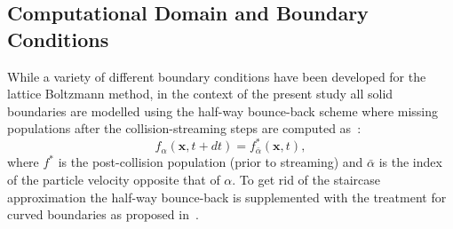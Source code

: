 \subsection{Computational Domain and Boundary Conditions}
\label{sec:numerics:domain}

While a variety of different boundary conditions have been developed for the lattice Boltzmann method, in the context of the present study all solid boundaries are modelled using the half-way bounce-back scheme where missing populations after the collision-streaming steps are computed as~\cite{kruger2017lattice}:
\begin{equation}
    f_\alpha\left(\bm{x},t+dt\right) = f^{*}_{\bar{\alpha}}\left(\bm{x},t\right),
\end{equation}
where $f^{*}$ is the post-collision population (prior to streaming) and $\bar{\alpha}$ is the index of the particle velocity opposite that of $\alpha$. To get rid of the staircase approximation the half-way bounce-back is supplemented with the treatment for curved boundaries as proposed in~\mbox{\cite{bouzidi2001momentum}}.

